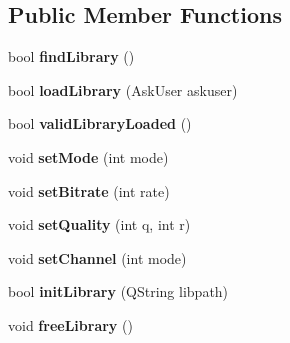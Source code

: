 \subsection*{Public Member Functions}
\begin{DoxyCompactItemize}
\item 
\mbox{\label{class_ms_1_1_m_p3_exporter_ab474e022609148d1e306ca7da318e79d}} 
bool {\bfseries find\+Library} ()
\item 
\mbox{\label{class_ms_1_1_m_p3_exporter_ab1e7dc452d99bc3105e024cff1372a45}} 
bool {\bfseries load\+Library} (Ask\+User askuser)
\item 
\mbox{\label{class_ms_1_1_m_p3_exporter_af6b8a063af1b561eebdb8af4c5c1bc50}} 
bool {\bfseries valid\+Library\+Loaded} ()
\item 
\mbox{\label{class_ms_1_1_m_p3_exporter_a5ab5242a5a9d64f4e41624dc4fa75204}} 
void {\bfseries set\+Mode} (int mode)
\item 
\mbox{\label{class_ms_1_1_m_p3_exporter_ae9a1a92f4465a5b57ca8f98cc81ee0e1}} 
void {\bfseries set\+Bitrate} (int rate)
\item 
\mbox{\label{class_ms_1_1_m_p3_exporter_a1ba880a32c73d312b5cb7ebbf9c061bf}} 
void {\bfseries set\+Quality} (int q, int r)
\item 
\mbox{\label{class_ms_1_1_m_p3_exporter_a854534a9e223373e37add9cf081ac0a3}} 
void {\bfseries set\+Channel} (int mode)
\item 
\mbox{\label{class_ms_1_1_m_p3_exporter_aa191acf0fdb0ea82cc29e7f6fdcabf96}} 
bool {\bfseries init\+Library} (Q\+String libpath)
\item 
\mbox{\label{class_ms_1_1_m_p3_exporter_acff5d31076f816d042bbf7e353026f09}} 
void {\bfseries free\+Library} ()
\item 
\mbox{\label{class_ms_1_1_m_p3_exporter_a4f6b817e88709cd4811da98bf8959cff}} 

\end{DoxyCompactItemize}

